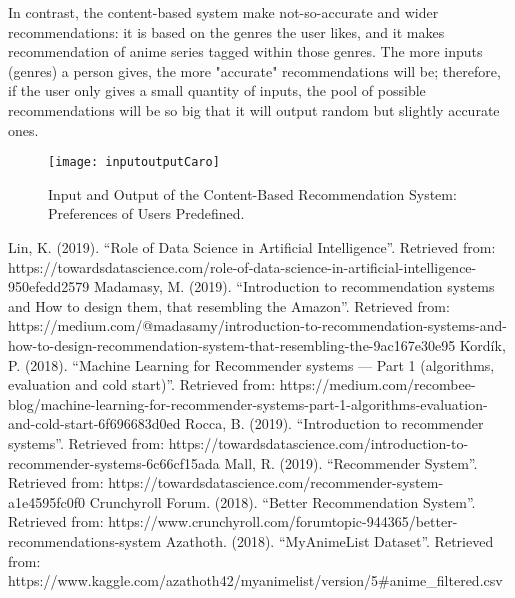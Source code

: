 \documentclass[conference]{IEEEtran}
\begin{document}
In contrast, the content-based system make not-so-accurate and wider recommendations: it is based on the genres the user likes, and it makes recommendation of anime series tagged within those genres. The more inputs (genres) a person gives, the more "accurate" recommendations will be; therefore, if the user only gives a small quantity of inputs, the pool of possible recommendations will be so big that it will output random but slightly accurate ones.
\begin{figure}[H]
	\centering
	\texttt{[image: inputoutputCaro]}
	\caption{Input and Output of the Content-Based Recommendation System: Preferences of Users Predefined.}
	\label{7}
\end{figure}

\begin{thebibliography}{00}
 Lin, K. (2019). “Role of Data Science in Artificial Intelligence”. Retrieved from: https://towardsdatascience.com/role-of-data-science-in-artificial-intelligence-950efedd2579
 Madamasy, M. (2019). “Introduction to recommendation systems and How to design them, that resembling the Amazon”. Retrieved from: https://medium.com/@madasamy/introduction-to-recommendation-systems-and-how-to-design-recommendation-system-that-resembling-the-9ac167e30e95
 Kordík, P. (2018). “Machine Learning for Recommender systems — Part 1 (algorithms, evaluation and cold start)”. Retrieved from: https://medium.com/recombee-blog/machine-learning-for-recommender-systems-part-1-algorithms-evaluation-and-cold-start-6f696683d0ed
 Rocca, B. (2019). “Introduction to recommender systems”. Retrieved from: https://towardsdatascience.com/introduction-to-recommender-systems-6c66cf15ada
 Mall, R. (2019). “Recommender System”. Retrieved from: https://towardsdatascience.com/recommender-system-a1e4595fc0f0
 Crunchyroll Forum. (2018). “Better Recommendation System”. Retrieved from: https://www.crunchyroll.com/forumtopic-944365/better-recommendations-system
 Azathoth. (2018). “MyAnimeList Dataset”. Retrieved from: https://www.kaggle.com/azathoth42/myanimelist/version/5\#anime\_filtered.csv

\end{thebibliography}
\end{document}
